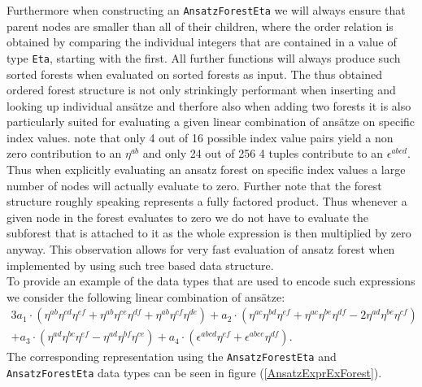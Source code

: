 \documentclass[a4paper,12pt, DIV=14, BCOR=5mm, twoside, headsepline, numbers=noenddot]{scrbook}
\begin{document}
Furthermore when constructing an \texttt{AnsatzForestEta} we will always ensure that parent nodes are smaller than all of their children, where the order relation is obtained by comparing the individual integers that are contained in a value of type \texttt{Eta}, starting with the first. All further functions will always produce such sorted forests when evaluated on sorted forests as input. 
The thus obtained ordered forest structure is not only strinkingly performant when inserting and looking up individual ansätze and therfore also when adding two forests it is also particularly suited for evaluating a given linear combination of ansätze on specific index values. note that only 4 out of 16 possible index value pairs yield a non zero contribution to an $\eta^{ab}$ and only 24 out of 256 4 tuples contribute to an $\epsilon^{abcd}$. Thus when explicitly evaluating an ansatz forest on specific index values a large number of nodes will actually evaluate to zero. Further note that the forest structure roughly speaking represents a fully factored product. Thus whenever a given node in the forest evaluates to zero we do not have to evaluate the subforest that is attached to it as the whole expression is then multiplied by zero anyway. This observation allows for very fast evaluation of ansatz forest when implemented by using such tree based data structure. \\

To provide an example of the data types that are used to encode such expressions we consider the following linear combination of ansätze:
\begin{multline}\label{AnsatzExprEx}
3a_1 \cdot \left (\eta^{ab}\eta^{cd}\eta^{ef} + \eta^{ab}\eta^{ce}\eta^{df} + \eta^{ab}\eta^{cf}\eta^{de} \right ) + a_2 \cdot \left ( \eta^{ac} \eta^{bd} \eta^{ef} + \eta^{ac} \eta^{be} \eta^{df} -2 \eta^{ad} \eta^{be} \eta^{cf} \right ) \\
+ a_3 \cdot \left ( \eta^{ad} \eta^{bc} \eta^{ef} - \eta^{ad} \eta^{bf} \eta^{ce} \right ) + a_4 \cdot \left ( \epsilon^{abcd} \eta^{ef} + \epsilon^{abce} \eta^{df}  \right )   .
\end{multline}
The corresponding representation using the \texttt{AnsatzForestEta} and \texttt{AnsatzForestEta} data types can be seen in figure (\ref{AnsatzExprExForest}).\\
\end{document}
